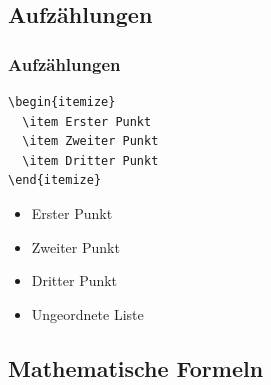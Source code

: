 \documentclass[aspectratio=169]{beamer}
\begin{document}

\subsection{Aufzählungen}
\begin{frame}[fragile]
\frametitle{Aufzählungen}

\begin{lstlisting}[language={[latex]TeX}]
\begin{itemize}
  \item Erster Punkt
  \item Zweiter Punkt
  \item Dritter Punkt
\end{itemize}
\end{lstlisting}

\vspace{1em}

\begin{itemize}
  \item Erster Punkt
  \item Zweiter Punkt
  \item Dritter Punkt
\end{itemize}

\vspace{1em}

\begin{itemize}
  \item Ungeordnete Liste
\end{itemize}

\end{frame}


\subsection{Mathematische Formeln}
\end{document}
